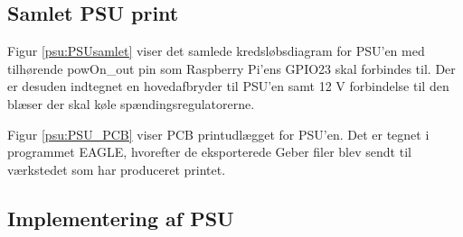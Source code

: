 \subsection{Samlet PSU print}


Figur \ref{psu:PSUsamlet} viser det samlede kredsløbsdiagram for PSU'en med tilhørende powOn\_out pin som Raspberry Pi'ens GPIO23 skal forbindes til. Der er desuden indtegnet en hovedafbryder til PSU'en samt 12 V forbindelse til den blæser der skal køle spændingsregulatorerne.

Figur \ref{psu:PSU_PCB} viser PCB printudlægget for PSU'en. Det er tegnet i programmet EAGLE, hvorefter de eksporterede Geber filer blev sendt til værkstedet som har produceret printet. 


\subsection{Implementering af PSU}


